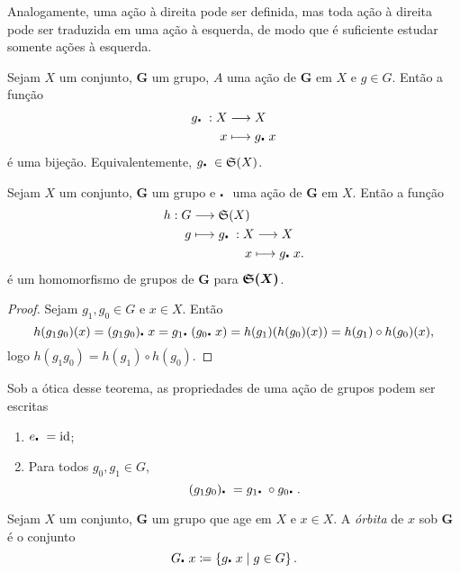 Analogamente, uma ação à direita pode ser definida, mas toda ação à direita pode ser traduzida em uma ação à esquerda, de modo que é suficiente estudar somente ações à esquerda.

\begin{prop}
Sejam $X$ um conjunto, $\bm G$ um grupo, $A$ uma ação de $\bm G$ em $X$ e $g \in G$. Então a função
	\begin{align*}
	{g\mathord{\centerdot}\ }: {X} &\longrightarrow {X} \\{x} &\longmapsto {g\mathord{\centerdot}\ x}
	\end{align*}
é uma bijeção. Equivalentemente, $g\mathord{\centerdot}\  \in \mathfrak{S}(X)$.
\end{prop}

\begin{prop}
Sejam $X$ um conjunto, $\bm G$ um grupo e $\mathord{\centerdot}\ $ uma ação de $\bm G$ em $X$. Então a função
	\begin{align*}
	h: G &\longrightarrow \mathfrak{S}(X) \\
			g &\longmapsto g\mathord{\centerdot}\ : X \longrightarrow X\\
				&\qquad\qquad\; x \longmapsto g\mathord{\centerdot}\  x.
	\end{align*}
é um homomorfismo de grupos de $\bm G$ para $\bm{\mathfrak{S}(X)}$.
\end{prop}
\begin{proof}
Sejam $g_1,g_0 \in G$ e $x \in X$. Então
	\begin{equation*}
	h(g_1g_0)(x) =(g_1g_0) \mathord{\centerdot}\  x = g_1 \mathord{\centerdot}\  (g_0 \mathord{\centerdot}\  x) = h(g_1)(h(g_0)(x)) = h(g_1) \circ h(g_0)(x),
	\end{equation*}
logo $h(g_1g_0)=h(g_1) \circ h(g_0)$.
\end{proof}

Sob a ótica desse teorema, as propriedades de uma ação de grupos podem ser escritas
	\begin{enumerate}
	\item $e\mathord{\centerdot}\  = \mathrm{id}$;
	\item Para todos $g_0,g_1 \in G$,
		\begin{equation*}
		(g_1g_0)\mathord{\centerdot}\  = g_1\mathord{\centerdot}\  \circ g_0\mathord{\centerdot}\ .
		\end{equation*}
	\end{enumerate}

\begin{defi}
Sejam $X$ um conjunto, $\bm G$ um grupo que age em $X$ e $x \in X$. A \emph{órbita} de $x$ sob $\bm G$ é o conjunto
	\begin{equation*}
	G \mathord{\centerdot}\  x \coloneqq \left\{g\mathord{\centerdot}\  x \;\middle\vert\; g \in G \right\}.
	\end{equation*}
\end{defi}



